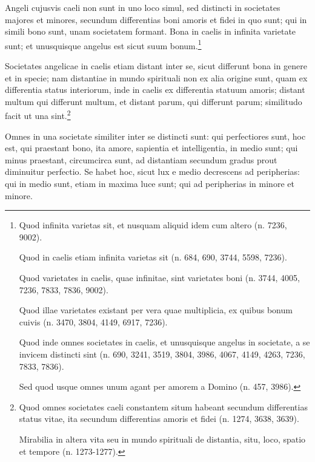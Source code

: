 
\begin{topic}{41}
    Angeli cujusvis caeli non sunt in uno loco simul, sed distincti in societates majores et minores, secundum
    differentias boni amoris et fidei in quo sunt; qui in simili bono sunt, unam societatem formant. Bona in caelis in
    infinita varietate sunt; et unusquisque angelus est sicut suum bonum.\footnote{Quod infinita varietas sit, et
    nusquam aliquid idem cum altero (n. 7236, 9002).

    Quod in caelis etiam infinita varietas sit (n. 684, 690, 3744, 5598, 7236).

    Quod varietates in caelis, quae infinitae, sint varietates boni (n. 3744, 4005, 7236, 7833, 7836, 9002).

    Quod illae varietates existant per vera quae multiplicia, ex quibus bonum cuivis (n. 3470, 3804, 4149, 6917, 7236).

    Quod inde omnes societates in caelis, et unusquisque angelus in societate, a se invicem distincti sint (n. 690,
    3241, 3519, 3804, 3986, 4067, 4149, 4263, 7236, 7833, 7836).

    Sed quod usque omnes unum agant per amorem a Domino (n. 457, 3986).}
\end{topic}

\begin{topic}{42}
    Societates angelicae in caelis etiam distant inter se, sicut differunt bona in genere et in specie; nam distantiae
    in mundo spirituali non ex alia origine sunt, quam ex differentia status interiorum, inde in caelis ex differentia
    statuum amoris; distant multum qui differunt multum, et distant parum, qui differunt parum; similitudo facit ut una
    sint.\footnote{Quod omnes societates caeli constantem situm habeant secundum differentias status vitae, ita secundum
    differentias amoris et fidei (n. 1274, 3638, 3639).

    Mirabilia in altera vita seu in mundo spirituali de distantia, situ, loco, spatio et tempore (n. 1273-1277).}
\end{topic}

\begin{topic}{43}
    Omnes in una societate similiter inter se distincti sunt: qui perfectiores sunt, hoc est, qui praestant bono, ita
    amore, sapientia et intelligentia, in medio sunt; qui minus praestant, circumcirca sunt, ad distantiam secundum
    gradus prout diminuitur perfectio. Se habet hoc, sicut lux e medio decrescens ad peripherias: qui in medio sunt,
    etiam in maxima luce sunt; qui ad peripherias in minore et minore.
\end{topic}

